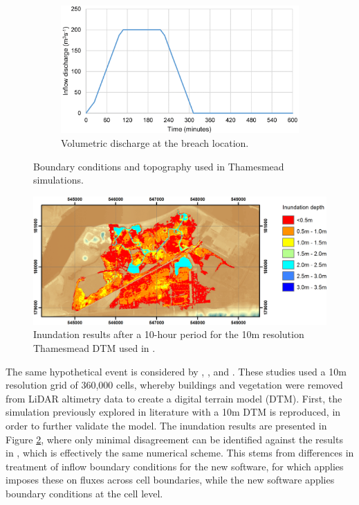 \begin{figure}[p]
	\begin{subfigure}[t]{0.7\textwidth}
		\centering
		\includegraphics[width=1.0\textwidth]{heterogeneous-dev-figures/Thamesmead_Inflow.png}
		\caption{Volumetric discharge at the breach location.}
	\end{subfigure}
	\caption{Boundary conditions and topography used in Thamesmead simulations.}
	\label{Thamesmead_Conditions}
\end{figure}
\begin{figure}[p]
	\centering
	\includegraphics[width=1.0\textwidth]{heterogeneous-dev-figures/Thamesmead_10m_Comparison.png}
	\caption{Inundation results after a 10-hour period for the 10m resolution Thamesmead DTM used in \citet{Liang2010a}.}
	\label{Thamesmead_10m_Comparison}
\end{figure}

The same hypothetical event is considered by \citet{Liang2008a}, \citet{Liang2010a}, and \citet{Vacondio2012}. These studies used a 10m resolution grid of 360,000 cells, whereby buildings and vegetation were removed from LiDAR altimetry data to create a digital terrain model (DTM). First, the simulation previously explored in literature with a 10m DTM is reproduced, in order to further validate the model. The inundation results are presented in Figure \ref{Thamesmead_10m_Comparison}, where only minimal disagreement can be identified against the results in \citet{Liang2010a}, which is effectively the same numerical scheme. This stems from differences in treatment of inflow boundary conditions for the new software, for which \citet{Liang2010a} applies imposes these on fluxes across cell boundaries, while the new software applies boundary conditions at the cell level.

